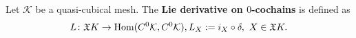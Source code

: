 \begin{definition}
  Let $\mathcal{K}$ be a quasi-cubical mesh.
  The \textbf{Lie derivative on $0$-cochains} is defined as
  \begin{equation}
    L \colon \mathfrak{X} K \to \mathop{\rm Hom}\nolimits(C^0 \mathcal{K}, C^0 \mathcal{K}),
    L_X := i_X \circ \delta,\ X \in \mathfrak{X} K.
  \end{equation}
\end{definition}
